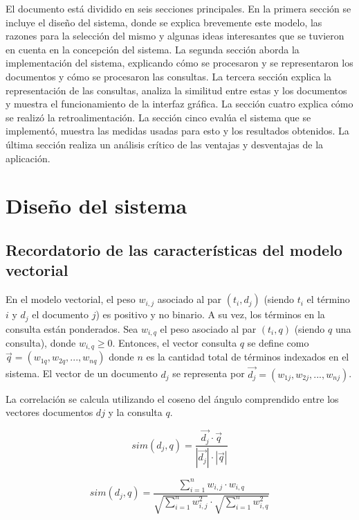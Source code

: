 \documentclass[runningheads]{llncs}
\begin{document}
El documento está dividido en seis secciones principales. En la primera sección se incluye el diseño del sistema, donde se explica brevemente este modelo, las razones para la selección del mismo y algunas ideas interesantes que se tuvieron en cuenta en la concepción del sistema. La segunda sección aborda la implementación del sistema, explicando cómo se procesaron y se representaron los documentos y cómo se procesaron las consultas. La tercera sección explica la representación de las consultas, analiza la similitud entre estas y los documentos y muestra el funcionamiento de la interfaz gráfica. La sección cuatro explica cómo se realizó la retroalimentación. La sección cinco  evalúa el sistema que se implementó, muestra  las medidas usadas para esto y los resultados obtenidos. La última sección realiza un análisis crítico de las ventajas y desventajas de la aplicación.

	\section{Dise\~{n}o del sistema}
	
	\subsection{Recordatorio de las caracter\'isticas del modelo vectorial}
	
	En el modelo vectorial, el peso $w_{i,j}$ asociado al par $(t_i,d_j)$ (siendo $t_i$ el t\'ermino $i$ y $d_j$ el documento $j$) es positivo y no binario. A su vez, los t\'erminos en la consulta est\'an ponderados. Sea $w_{i,q}$ el peso asociado al par $(t_i,q)$ (siendo $q$ una consulta), donde $w_{i,q}\geq 0$. Entonces, el vector consulta $q$ se define como $\overrightarrow{q}=(w_{1q},w_{2q},...,w_{nq})$ donde $n$ es la cantidad total de t\'erminos indexados en el sistema. El vector de un documento $d_j$ se representa por $\overrightarrow{d_j}=(w_{1j},w_{2j},...,w_{nj})$.
	
	La correlaci\'on se calcula utilizando el coseno del \'angulo comprendido entre los vectores documentos $dj$ y la consulta $q$.
	
	\begin{equation}
		sim(d_j,q)=\frac{\overrightarrow{d_j}\cdot\overrightarrow{q}}{|\overrightarrow{d_j}|\cdot|\overrightarrow{q}|}
	\end{equation}

	\begin{equation}	
		sim(d_j,q)=\frac{\sum_{i=1}^{n}w_{i,j}\cdot w_{i,q}}{\sqrt{\sum_{i=1}^{n}w_{i,j}^2}\cdot\sqrt{\sum_{i=1}^{n}w_{i,q}^2}}
	\end{equation}  
\end{document}
